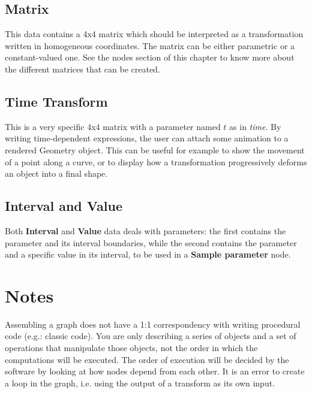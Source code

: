\subsection{Matrix}
This data contains a 4x4 matrix which should be interpreted as a transformation written in
homogeneous coordinates. The matrix can be either parametric or a constant-valued one.
See the nodes section of this chapter to know more about the different matrices that can
be created.

\subsection{Time Transform}
This is a very specific 4x4 matrix with a parameter named $t$ as in \textit{time}.
By writing time-dependent expressions, the user can attach some animation to 
a rendered Geometry object. This can be useful for example to show the movement of a
point along a curve, or to display how a transformation progressively deforms an object
into a final shape.

\subsection{Interval and Value}
Both \textbf{Interval} and \textbf{Value} data deals with parameters: the first contains
the parameter and its interval boundaries, while the second contains the parameter and
a specific value in its interval, to be used in a \textbf{Sample parameter} node.


\section{Notes}
Assembling a graph does not have a 1:1 correspondency with writing procedural
code (e.g.: classic \CC{} code). You are only describing a series of
objects and a set of operations that manipulate those objects, not the order
in which the computations will be executed. The order of execution will be
decided by the software by looking at how nodes depend from each other.
It is an error to create a loop in the graph, i.e. using the output of a
transform as its own input.

